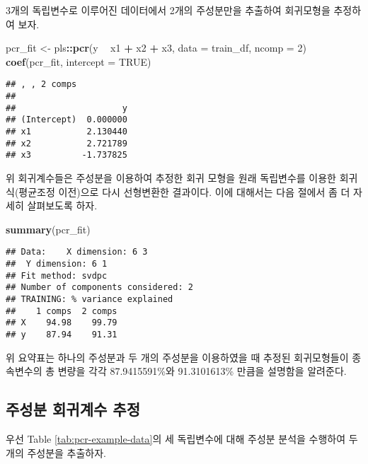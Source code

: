 \documentclass[]{book}
\newenvironment{Shaded}{\begin{snugshade}}{\end{snugshade}}
\newcommand{\DataTypeTok}[1]{\textcolor[rgb]{0.13,0.29,0.53}{#1}}
\newcommand{\DecValTok}[1]{\textcolor[rgb]{0.00,0.00,0.81}{#1}}
\newcommand{\KeywordTok}[1]{\textcolor[rgb]{0.13,0.29,0.53}{\textbf{#1}}}
\newcommand{\NormalTok}[1]{#1}
\newcommand{\OperatorTok}[1]{\textcolor[rgb]{0.81,0.36,0.00}{\textbf{#1}}}
\newcommand{\OtherTok}[1]{\textcolor[rgb]{0.56,0.35,0.01}{#1}}
\newcommand{\StringTok}[1]{\textcolor[rgb]{0.31,0.60,0.02}{#1}}
\begin{document}
3개의 독립변수로 이루어진 데이터에서 2개의 주성분만을 추출하여 회귀모형을 추정하여 보자.

\begin{Shaded}
\begin{Highlighting}[]
\NormalTok{pcr_fit <-}\StringTok{ }\NormalTok{pls}\OperatorTok{::}\KeywordTok{pcr}\NormalTok{(y }\OperatorTok{~}\StringTok{ }\NormalTok{x1 }\OperatorTok{+}\StringTok{ }\NormalTok{x2 }\OperatorTok{+}\StringTok{ }\NormalTok{x3, }\DataTypeTok{data =}\NormalTok{ train_df, }\DataTypeTok{ncomp =} \DecValTok{2}\NormalTok{)}
\KeywordTok{coef}\NormalTok{(pcr_fit, }\DataTypeTok{intercept =} \OtherTok{TRUE}\NormalTok{)}
\end{Highlighting}
\end{Shaded}

\begin{verbatim}
## , , 2 comps
## 
##                     y
## (Intercept)  0.000000
## x1           2.130440
## x2           2.721789
## x3          -1.737825
\end{verbatim}

위 회귀계수들은 주성분을 이용하여 추정한 회귀 모형을 원래 독립변수를 이용한 회귀식(평균조정 이전)으로 다시 선형변환한 결과이다. 이에 대해서는 다음 절에서 좀 더 자세히 살펴보도록 하자.

\begin{Shaded}
\begin{Highlighting}[]
\KeywordTok{summary}\NormalTok{(pcr_fit)}
\end{Highlighting}
\end{Shaded}

\begin{verbatim}
## Data:    X dimension: 6 3 
##  Y dimension: 6 1
## Fit method: svdpc
## Number of components considered: 2
## TRAINING: % variance explained
##    1 comps  2 comps
## X    94.98    99.79
## y    87.94    91.31
\end{verbatim}

위 요약표는 하나의 주성분과 두 개의 주성분을 이용하였을 때 추정된 회귀모형들이 종속변수의 총 변량을 각각 87.9415591\%와 91.3101613\% 만큼을 설명함을 알려준다.

\hypertarget{pcr-regression-coefficient}{%
\subsection{주성분 회귀계수 추정}\label{pcr-regression-coefficient}}

우선 Table \ref{tab:pcr-example-data}의 세 독립변수에 대해 주성분 분석을 수행하여 두 개의 주성분을 추출하자.
\end{document}
